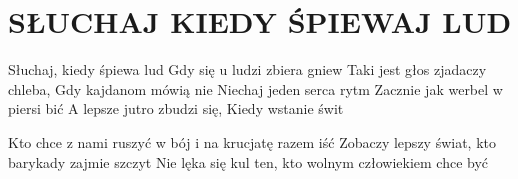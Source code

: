 \documentclass[../../../songbook.tex]{subfiles}
\begin{document}
\TabPositions{9cm} %
\section*{SŁUCHAJ KIEDY ŚPIEWAJ LUD}
{}
\vspace{0.5cm}
\-\hspace{1cm} Słuchaj, kiedy śpiewa lud		 \newline
\-\hspace{1cm} Gdy się u ludzi zbiera gniew		 \newline
\-\hspace{1cm} Taki jest głos zjadaczy chleba,	 \newline
\-\hspace{1cm} Gdy kajdanom mówią nie		  	 \newline
\-\hspace{1cm} Niechaj jeden serca rytm			 \newline
\-\hspace{1cm} Zacznie jak werbel w piersi bić	 \newline
\-\hspace{1cm} A lepsze jutro zbudzi się, 		 \newline
\-\hspace{1cm} Kiedy wstanie świt				 \newline

Kto chce z nami ruszyć w bój i na krucjatę razem iść		 \newline
Zobaczy lepszy świat, kto barykady zajmie szczyt			 \newline
Nie lęka się kul ten, kto wolnym człowiekiem chce być	 	 \newline
\end{document}
